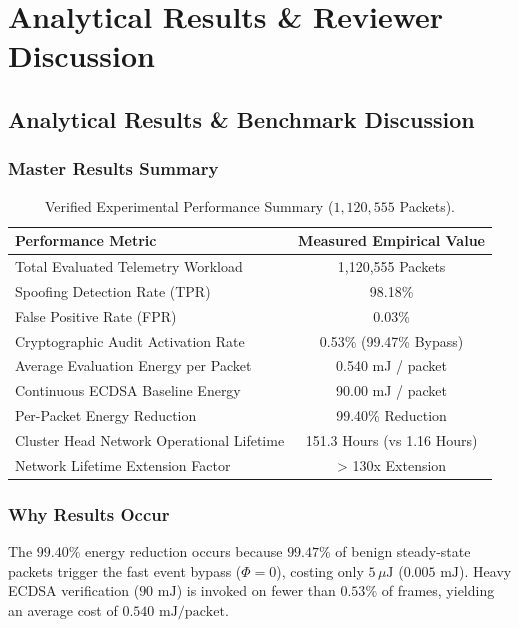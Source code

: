 \documentclass[11pt,a4paper,oneside]{book}
\begin{document}
\part{Analytical Results \& Reviewer Discussion}

\chapter{Analytical Results \& Benchmark Discussion}

\section{Master Results Summary}
\begin{table}[htbp]
\centering
\small
\caption{Verified Experimental Performance Summary ($1,120,555$ Packets).}
\begin{tabular}{|l|c|}
\hline
\textbf{Performance Metric} & \textbf{Measured Empirical Value} \\ \hline
Total Evaluated Telemetry Workload & 1,120,555 Packets \\ \hline
Spoofing Detection Rate (TPR) & 98.18\% \\ \hline
False Positive Rate (FPR) & 0.03\% \\ \hline
Cryptographic Audit Activation Rate & 0.53\% (99.47\% Bypass) \\ \hline
Average Evaluation Energy per Packet & 0.540 mJ / packet \\ \hline
Continuous ECDSA Baseline Energy & 90.00 mJ / packet \\ \hline
Per-Packet Energy Reduction & 99.40\% Reduction \\ \hline
Cluster Head Network Operational Lifetime & 151.3 Hours (vs 1.16 Hours) \\ \hline
Network Lifetime Extension Factor & > 130x Extension \\ \hline
\end{tabular}
\end{table}

\section{Why Results Occur}
The $99.40\%$ energy reduction occurs because $99.47\%$ of benign steady-state packets trigger the fast event bypass ($\Phi = 0$), costing only $5\,\mu\text{J}$ ($0.005\text{ mJ}$). Heavy ECDSA verification ($90\text{ mJ}$) is invoked on fewer than $0.53\%$ of frames, yielding an average cost of $0.540\text{ mJ/packet}$.
\end{document}
